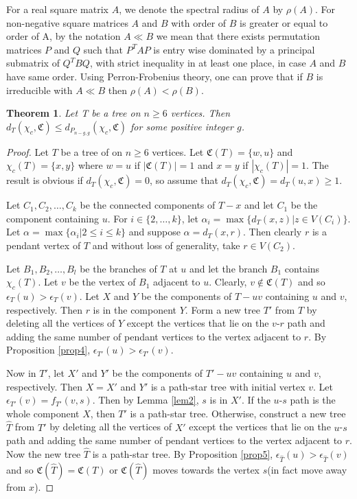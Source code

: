 \documentclass[11pt]{article}
\newtheorem{theorem}{Theorem}[section]
\begin{document}
For a real square matrix $A$, we denote the spectral radius of $A$ by $\rho(A)$. For non-negative square matrices $A$ and $B$ with order of $B$ is greater or equal to order of A, by the notation $A\ll B$  we mean that there exists permutation matrices $P$ and $Q$ such that $P^TAP$ is entry wise dominated by a principal submatrix of $Q^TBQ$, with strict inequality in at least one place, in case $A$ and $B$ have same order. Using Perron-Frobenius theory, one can prove that if $B$ is irreducible with $A\ll B$  then $\rho(A)<\rho(B)$.  

\begin{theorem}\label{thm:ch4}
Let T be a tree on $n\geq 6$ vertices. Then  $d_T(\chi_c,\mathfrak{C})\leq d_{P_{n-g,g}}(\chi_c,\mathfrak{C})$ for some positive integer $g$.
\end{theorem}
\begin{proof}
Let $T$ be a tree of on $n\geq 6$ vertices. Let $\mathfrak{C}(T)=\{w,u\}$ and $\chi_c(T)=\{x,y\}$ where $w=u$ if $|\mathfrak{C}(T)|=1$ and $x=y$ if $|\chi_c(T)|=1$.  The result is obvious if $d_T(\chi_c,\mathfrak{C})=0$, so assume that  $d_T(\chi_c,\mathfrak{C})=d_T(u,x)\geq 1$.

Let  $C_1,C_2,\ldots,C_k$ be the connected components of $T-x$ and let $C_1$ be the component containing $u$. For $i\in \{2,\ldots,k\}$, let $\alpha_i=\max\{d_T(x,z)|z\in V(C_i)\}$. Let $\alpha=\max\{\alpha_i|2\leq i\leq k\}$ and suppose $\alpha=d_T(x,r)$. Then clearly $r$ is a pendant vertex of $T$ and without loss of generality, take $r\in V(C_2)$.

Let $B_1,B_2,\ldots,B_l$ be the branches of $T$ at $u$ and let the branch $B_1$ contains $\chi_c(T).$ Let $v$ be the vertex of $B_1$ adjacent to $u$. Clearly, $v\notin \mathfrak{C}(T)$ and so $\epsilon_T(u)>\epsilon_T(v)$. Let $X$ and $Y$ be the components of $T-uv$ containing $u$ and $v$, respectively. Then $r$ is in the component $Y$. Form  a new tree $T'$ from $T$ by deleting all the vertices of $Y$ except the vertices that lie on the $v$-$r$ path and adding the same number of pendant vertices to the vertex adjacent to $r$. By Proposition \ref{prop4}, $\epsilon_{T'}(u)>\epsilon_{T'}(v)$. 

Now in $T'$, let $X'$ and $Y'$ be the components of $T'-uv$ containing $u$ and $v$, respectively. Then $X=X'$ and $Y'$ is a path-star tree with initial vertex $v$. Let  $\epsilon_{T'}(v)=f_{T'}(v,s)$. Then by Lemma \ref{lem2}, $s$ is in $X'$. If  the $u$-$s$ path is the whole component $X$, then $T'$ is a path-star tree. Otherwise, construct a new tree 
$\hat{T}$ from $T'$ by deleting all the vertices of $X'$ except the vertices that lie on the $u$-$s$ path and adding the same number of pendant vertices to the vertex adjacent to $r$. Now the new tree $\hat{T}$ is a path-star tree. By Proposition \ref{prop5}, $\epsilon_{\hat{T}}(u)>\epsilon_{\hat{T}}(v)$ and so $\mathfrak{C}(\hat{T})=\mathfrak{C}(T)$ or $\mathfrak{C}(\hat{T})$ moves towards the vertex $s$(in fact move away from $x$).


\end{proof}
\end{document}

